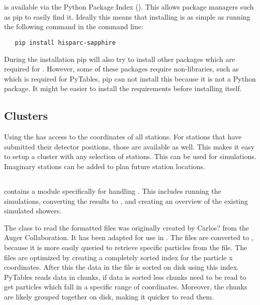 \section{\sapphire}

\subsection{\pypi}

\sapphire is available via the Python Package Index (\pypi). This allows
package managers such as pip to easily find it. Ideally this means that installing \sapphire is as simple as running the following command in the command line:
%
\begin{verbatim}
   pip install hisparc-sapphire
\end{verbatim}

During the installation pip will also try to install other packages which are required for \sapphire. However, some of these packages require non-\python libraries, such as \hdf which is required for PyTables, pip can not install this because it is not a Python package. It might be easier to install the requirements before installing \sapphire itself.


\subsection{Clusters}

Using the \api \sapphire has access to the \gps coordinates of all stations. For stations that have submitted their detector positions, those are available as well. This makes it easy to setup a cluster with any selection of \hisparc stations. This can be used for simulations. Imaginary stations can be added to plan future station locations.


\subsection{\corsika}

\sapphire contains a module specifically for handling \corsika. This includes running the \corsika simulations, converting the results to \hdf, and creating an overview of the existing \corsika simulated showers.

The class to read the \corsika \fortran formatted files was originally created by Carlos? from the Auger Collaboration. It has been adapted for use in \hisparc. The files are converted to \hdf, because it is more easily queried to retrieve specific particles from the file. The \hdf files are optimized by creating a completely sorted index for the particle x coordinates. After this the data in the file is sorted on disk using this index. PyTables reads data in chunks, if data is sorted less chunks need to be read to get particles which fall in a specific range of coordinates. Moreover, the chunks are likely grouped together on disk, making it quicker to read them.


